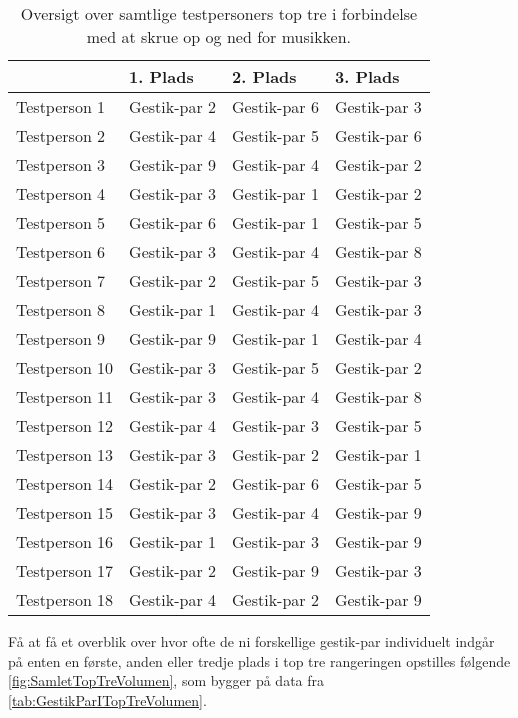\begin{table}[H]
	\centering
	\begin{tabular}{ | p{3cm} | p{3cm} | p{3cm} | p{3cm} |}
		\hline
		& 1. Plads & 2. Plads & 3. Plads \\ \hline
		Testperson 1 & Gestik-par 2 & Gestik-par 6 & Gestik-par 3 \\ \hline
		Testperson 2 & Gestik-par 4 & Gestik-par 5 & Gestik-par 6 \\ \hline
		Testperson 3 & Gestik-par 9 & Gestik-par 4 & Gestik-par 2 \\ \hline
		Testperson 4 & Gestik-par 3 & Gestik-par 1 & Gestik-par 2 \\ \hline
		Testperson 5 & Gestik-par 6 & Gestik-par 1 & Gestik-par 5 \\ \hline
		Testperson 6 & Gestik-par 3 & Gestik-par 4 & Gestik-par 8 \\ \hline 
		Testperson 7 & Gestik-par 2 & Gestik-par 5 & Gestik-par 3 \\ \hline
		Testperson 8 & Gestik-par 1 & Gestik-par 4 & Gestik-par 3 \\ \hline
		Testperson 9 & Gestik-par 9 & Gestik-par 1 & Gestik-par 4 \\ \hline
		Testperson 10 & Gestik-par 3 & Gestik-par 5 & Gestik-par 2 \\ \hline
		Testperson 11 & Gestik-par 3 & Gestik-par 4 & Gestik-par 8 \\ \hline
		Testperson 12 & Gestik-par 4 & Gestik-par 3 & Gestik-par 5 \\ \hline
		Testperson 13 & Gestik-par 3 & Gestik-par 2 & Gestik-par 1 \\ \hline
		Testperson 14 & Gestik-par 2 & Gestik-par 6 & Gestik-par 5 \\ \hline
		Testperson 15 & Gestik-par 3 & Gestik-par 4 & Gestik-par 9 \\ \hline
		Testperson 16 & Gestik-par 1 & Gestik-par 3 & Gestik-par 9 \\ \hline
		Testperson 17 & Gestik-par 2 & Gestik-par 9 & Gestik-par 3 \\ \hline
		Testperson 18 & Gestik-par 4 & Gestik-par 2 & Gestik-par 9 \\ \hline
	\end{tabular}
	\caption{Oversigt over samtlige testpersoners top tre i forbindelse med at skrue op og ned for musikken.}
	\label{tab:GestikParITopTreVolumen}
\end{table}
\noindent
%
Få at få et overblik over hvor ofte de ni forskellige gestik-par individuelt indgår på enten en første, anden eller tredje plads i top tre rangeringen opstilles følgende \autoref{fig:SamletTopTreVolumen}, som bygger på data fra \autoref{tab:GestikParITopTreVolumen}. 
